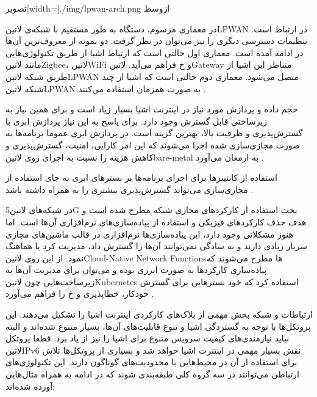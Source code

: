 ‌تصویر[width=\textwidth]{./img/lpwan-arch.png}
‌ازوسط

در معماری مرسوم، دستگاه به طور مستقیم با شبکه‌ی ‌لاتین{LPWAN} در ارتباط است.
تنظیمات دسترسی دیگری را نیز می‌توان در نظر گرفت. دو نمونه از معروف‌ترین آن‌ها
در ادامه آمده است.
معماری اول حالتی است که ارتباط اشیا از طریق تکنولوژی‌هایی مانند ‌لاتین{Zigbee}،
‌لاتین{WiFi} و ‌خ فراهم می‌آید. ‌لاتین{Gateway} متناظر این اشیا از طریق
شبکه ‌لاتین{LPWAN} متصل می‌شود.
معماری دوم حالتی است که اشیا از چند شبکه ‌لاتین{LPWAN} به صورت همزمان استفاده می‌کنند
.


حجم داده و پردازش مورد نیاز در اینترنت اشیا بسیار زیاد است و برای همین نیاز به زیرساختی قابل گسترش وجود دارد.
برای پاسخ به این نیاز پردازش ابری با گسترش‌پذیری و ظرفیت بالا، بهترین گزینه است.
در پردازش ابری عموما برنامه‌ها به صورت مجازی‌سازی شده اجرا می‌شوند که این امر کارایی، امنیت، گسترش‌پذیری و کاهش هزینه
را نسبت به اجرای روی ‌لاتین{bare-metal} به ارمغان می‌آورد
.

استفاده از کانتینرها برای اجرای برنامه‌ها بر بسترهای ابری به جای استفاده از مجازی‌سازی می‌تواند گسترش‌پذیری
بیشتری را به همراه داشته باشد
.

در شبکه‌های ‌لاتین{5G} بحث استفاده از کارکردهای مجازی شبکه مطرح شده است و هدف حذف کارکردهای فیزیکی
و استفاده از پیاده‌سازی‌های نرم‌افزاری آن‌ها است. اما هنوز مشکلاتی وجود دارد،
این پیاده‌سازی‌ها نرم‌افزاری در قالب ماشین‌های مجازی سربار زیادی دارند
و به سادگی نمی‌توانند آن‌ها را گسترش داد، مدیریت کرد یا هماهنگ نمود.
از این روی ‌لاتین{Cloud-Native Network Functions}ها مطرح می‌شوند که پیاده‌سازی کارکردها به صورت ابرزی بوده
و می‌توان برای مدیریت آن‌ها به زیرساخت‌هایی چون ‌لاتین{Kubernetes} استفاده کرد که خود بسترهایی برای
گسترش خودکار، خطاپذیری و ‌خ را فراهم می‌آورد
.


ارتباطات و شبکه بخش مهمی از بلاک‌های کارکردی اینترنت اشیا را تشکیل می‌دهند.
این پروتکل‌ها با توجه به گستردگی اشیا و تنوع قابلیت‌های آن‌ها، بسیار متنوع شده‌اند و البته نباید نیازمندی‌های کیفیت سرویس متنوع برای اشیا را نیز از یاد برد.
قطعا پروتکل ‌لاتین{IPv6} نقش بسیار مهمی در اینتنرت اشیا خواهد شد و بسیاری از پروتکل‌ها تلاش برای استفاده از آن در محیط‌هایی با محدودیت‌های گوناگون دارند.
این تکنولوژی‌های ارتباطی می‌توانند در سه گروه کلی طبقه‌بندی شوند که در ادامه به همراه مثال‌هایی آورده شده‌اند:

